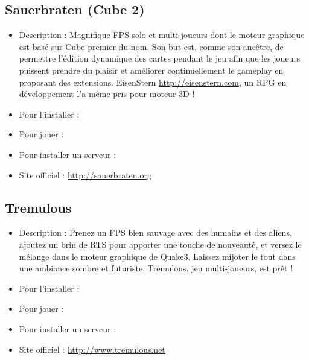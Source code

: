 \subsection{Sauerbraten (Cube 2)}
\begin{itemize}
\begingroup
{}
\item Description : Magnifique FPS solo et multi-joueurs dont le moteur graphique est basé sur Cube premier du nom. Son but est, comme son ancêtre, de permettre l'édition dynamique des cartes pendant le jeu afin que les joueurs puissent prendre du plaisir et améliorer continuellement le gameplay en proposant des extensions. EisenStern \url{http://eisenstern.com}, un RPG  en développement l'a même pris pour moteur 3D !{\par}
\endgroup
\item Pour l'installer : 
\item Pour jouer : 
\item Pour installer un serveur : 
\item Site officiel : \url{http://sauerbraten.org}{\par}
\end{itemize}
\subsection{Tremulous}
\begin{itemize}
\begingroup
{}
\item Description : Prenez un FPS bien sauvage avec des humains et des aliens, ajoutez un brin de RTS pour apporter une touche de nouveauté, et versez le mélange dans le moteur graphique de Quake3. Laissez mijoter le tout dans une ambiance sombre et futuriste. Tremulous, jeu multi-joueurs, est prêt !{\par}
\endgroup
\item Pour l'installer : 
\item Pour jouer : 
\item Pour installer un serveur : 
\item Site officiel : \url{http://www.tremulous.net}{\par}
\end{itemize}
